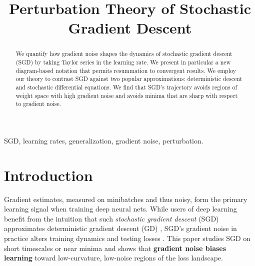 \documentclass[anon,12pt]{colt2021} %
\title[A Perturbative Analysis of SGD at Small Learning Rates]{
    Perturbation Theory of Stochastic Gradient Descent 
}
\begin{document}
    \maketitle
    
    \begin{abstract}%
        We quantify how gradient noise shapes the dynamics of stochastic
        gradient descent (SGD) by taking Taylor series in the learning rate.
        We present in particular a new diagram-based notation that permits
        resummation to convergent results.
        We employ our theory to contrast SGD against two popular
        approximations: deterministic descent and stochastic differential
        equations.  We find that SGD's trajectory avoids regions of weight
        space with high gradient noise and avoids minima that are sharp with
        respect to gradient noise.
    \end{abstract}
    
    \begin{keywords}%
        SGD, learning rates, generalization, gradient noise, perturbation. 
    \end{keywords}

    \section{Introduction}\label{sect:intro}


            Gradient estimates, measured on minibatches and thus noisy, form
            the primary learning signal when training deep neural nets.  While
            users of deep learning benefit from the intuition that such
            \emph{stochastic gradient descent} (SGD) approximates deterministic
            gradient descent (GD) \citep{bo91,le15}, SGD's gradient noise in
            practice alters training dynamics and testing losses
            \citep{go18, %
            wu20}.  This paper studies SGD on
            short timescales or near minima and shows that \textbf{gradient
            noise biases learning} toward low-curvature, low-noise regions of
            the loss landscape.
\end{document}
